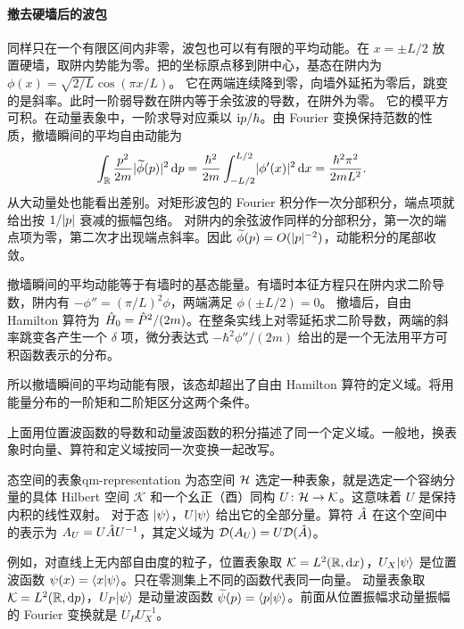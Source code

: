 \paragraph{撤去硬墙后的波包}
同样只在一个有限区间内非零，波包也可以有有限的平均动能。在 $x = \pm L/2$ 放置硬墙，取阱内势能为零。把的坐标原点移到阱中心，基态在阱内为 $\phi(x) = \sqrt{2/L}\cos(\pi x/L)$。
它在两端连续降到零，向墙外延拓为零后，跳变的是斜率。此时一阶弱导数在阱内等于余弦波的导数，在阱外为零。
它的模平方可积。在动量表象中，一阶求导对应乘以 $\mathrm{i} p/\hbar$。由 Fourier 变换保持范数的性质，撤墙瞬间的平均自由动能为
\[
    \int_{\mathbb{R}}\frac{p^2}{2m}\lvert\widetilde\phi(p)\rvert^2\mathop{}\!\mathrm{d} p
    = \frac{\hbar^2}{2m}\int_{-L/2}^{L/2}\lvert\phi'(x)\rvert^2\mathop{}\!\mathrm{d} x
    = \frac{\hbar^2\pi^2}{2mL^2}.
\]
从大动量处也能看出差别。对矩形波包的 Fourier 积分作一次分部积分，端点项就给出按 $1/\lvert p\rvert$ 衰减的振幅包络。
对阱内的余弦波作同样的分部积分，第一次的端点项为零，第二次才出现端点斜率。因此 $\widetilde\phi(p) = O(\lvert p\rvert^{-2})$，动能积分的尾部收敛。

撤墙瞬间的平均动能等于有墙时的基态能量。有墙时本征方程只在阱内求二阶导数，阱内有 $-\phi'' = (\pi/L)^2\phi$，两端满足 $\phi(\pm L/2) = 0$。
撤墙后，自由 Hamilton 算符为 $\hat{H}_0 = \hat{P}^2/(2m)$。在整条实线上对零延拓求二阶导数，两端的斜率跳变各产生一个 $\delta$ 项，微分表达式 $-\hbar^2\phi''/(2m)$ 给出的是一个无法用平方可积函数表示的分布。

所以撤墙瞬间的平均动能有限，该态却超出了自由 Hamilton 算符的定义域。将用能量分布的一阶矩和二阶矩区分这两个条件。

上面用位置波函数的导数和动量波函数的积分描述了同一个定义域。一般地，换表象时向量、算符和定义域按同一次变换一起改写。
\begin{definition}{态空间的表象}{qm-representation}
    为态空间 $\mathcal H$ 选定一种表象，就是选定一个容纳分量的具体 Hilbert 空间 $\mathcal K$ 和一个幺正（酉）同构 $U\colon \mathcal H \to \mathcal K$。这意味着 $U$ 是保持内积的线性双射。
    对于态 $\lvert\psi\rangle$，$U\lvert\psi\rangle$ 给出它的全部分量。算符 $\hat{A}$ 在这个空间中的表示为 $A_U = U\hat{A} U^{-1}$，其定义域为 $\mathcal D(A_U) = U\mathcal D(\hat{A})$。
\end{definition}
例如，对直线上无内部自由度的粒子，位置表象取 $\mathcal K = L^2(\mathbb{R},\mathop{}\!\mathrm{d} x)$，$U_X\lvert\psi\rangle$ 是位置波函数 $\psi(x) = \langle x\vert\psi\rangle$。只在零测集上不同的函数代表同一向量。
动量表象取 $\mathcal K = L^2(\mathbb{R},\mathop{}\!\mathrm{d} p)$，$U_P\lvert\psi\rangle$ 是动量波函数 $\widetilde\psi(p) = \langle p\vert\psi\rangle$。前面从位置振幅求动量振幅的 Fourier 变换就是 $U_P U_X^{-1}$。

